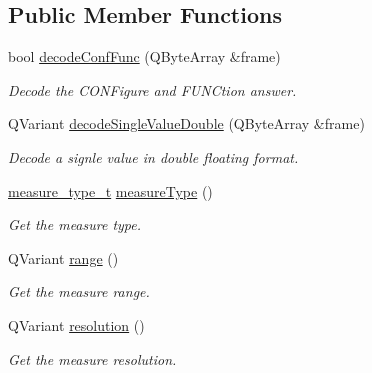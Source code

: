 \subsection*{Public Member Functions}
\begin{DoxyCompactItemize}
\item 
bool \hyperlink{classmdt_frame_codec_scpi_u3606_a_adb24e0835c2407e15be1a5a2780f965c}{decodeConfFunc} (QByteArray \&frame)
\begin{DoxyCompactList}\small\item\em Decode the CONFigure and FUNCtion answer. \end{DoxyCompactList}\item 
QVariant \hyperlink{classmdt_frame_codec_scpi_u3606_a_a3ca37c46462e24f9c26d4e352fe2db40}{decodeSingleValueDouble} (QByteArray \&frame)
\begin{DoxyCompactList}\small\item\em Decode a signle value in double floating format. \end{DoxyCompactList}\item 
\hypertarget{classmdt_frame_codec_scpi_u3606_a_a5d2c549ceee92ed152d79b643caab594}{
\hyperlink{classmdt_frame_codec_scpi_u3606_a_a3d7a1de14d77797a08e3d2991fa9f004}{measure\_\-type\_\-t} \hyperlink{classmdt_frame_codec_scpi_u3606_a_a5d2c549ceee92ed152d79b643caab594}{measureType} ()}
\label{classmdt_frame_codec_scpi_u3606_a_a5d2c549ceee92ed152d79b643caab594}

\begin{DoxyCompactList}\small\item\em Get the measure type. \end{DoxyCompactList}\item 
\hypertarget{classmdt_frame_codec_scpi_u3606_a_a2592942192dce715fb828612e2a7e1c9}{
QVariant \hyperlink{classmdt_frame_codec_scpi_u3606_a_a2592942192dce715fb828612e2a7e1c9}{range} ()}
\label{classmdt_frame_codec_scpi_u3606_a_a2592942192dce715fb828612e2a7e1c9}

\begin{DoxyCompactList}\small\item\em Get the measure range. \end{DoxyCompactList}\item 
\hypertarget{classmdt_frame_codec_scpi_u3606_a_a3657c8a712ba324b1d5b10a789a32501}{
QVariant \hyperlink{classmdt_frame_codec_scpi_u3606_a_a3657c8a712ba324b1d5b10a789a32501}{resolution} ()}
\label{classmdt_frame_codec_scpi_u3606_a_a3657c8a712ba324b1d5b10a789a32501}

\begin{DoxyCompactList}\small\item\em Get the measure resolution. \end{DoxyCompactList}\end{DoxyCompactItemize}


